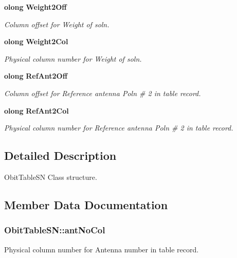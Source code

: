 \begin{CompactItemize}
{\bf olong} {\bf Weight2Off}
\begin{CompactList}\small\item\em Column offset for Weight of soln. \item\end{CompactList}\item 
{\bf olong} {\bf Weight2Col}
\begin{CompactList}\small\item\em Physical column number for Weight of soln. \item\end{CompactList}\item 
{\bf olong} {\bf Ref\-Ant2Off}
\begin{CompactList}\small\item\em Column offset for Reference antenna Poln \# 2 in table record. \item\end{CompactList}\item 
{\bf olong} {\bf Ref\-Ant2Col}
\begin{CompactList}\small\item\em Physical column number for Reference antenna Poln \# 2 in table record. \item\end{CompactList}\end{CompactItemize}


\subsection{Detailed Description}
Obit\-Table\-SN Class structure. 



\subsection{Member Data Documentation}
\subsubsection{ {\bf Obit\-Table\-SN::ant\-No\-Col}}\label{structObitTableSN_o29}


Physical column number for Antenna number in table record. 

